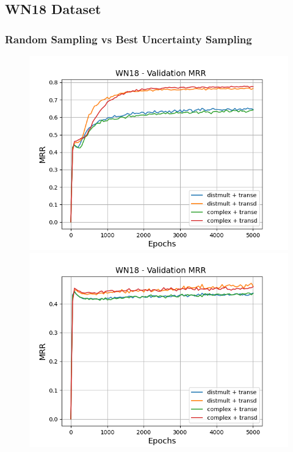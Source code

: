 \subsection{WN18 Dataset}

\subsubsection{Random Sampling vs Best Uncertainty Sampling}


\begin{figure}
    \centering
    \begin{minipage}{.5\textwidth}
      \centering
      \includegraphics[width=0.9\linewidth]{figures/results/gan_train/not_pretrained/random/wn18/gan_train_random_wn18_mrrs.png}
    \end{minipage}%
    \begin{minipage}{.5\textwidth}
      \centering
      \includegraphics[width=0.9\linewidth]{figures/results/gan_train/not_pretrained/uncertainty/max_distribution/entropy/wn18/gan_train_uncertainty_wn18_mrrs.png}

\end{minipage}
\end{figure}
